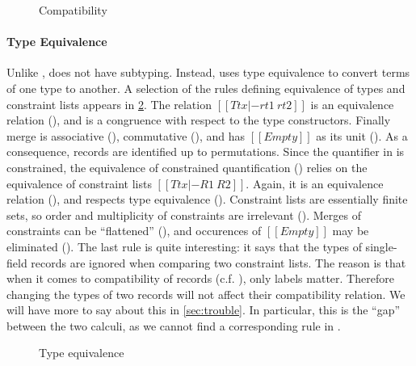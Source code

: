 \begin{figure}[t]
  \centering
{}


\caption{Compatibility}
\label{fig:compatible}

\end{figure}

\paragraph{Type Equivalence}

Unlike \fnamee, \rname does not have subtyping. Instead, \rname uses type
equivalence to convert terms of one type to another. A selection of the rules
defining equivalence of types and constraint lists appears in
\cref{fig:type_equivalence}. The relation $[[Ttx |- rt1 ~ rt2]]$ is an
equivalence relation (), and is a congruence
with respect to the type constructors. Finally merge is associative
(), commutative (), and has $[[Empty]]$
as its unit (). As a consequence, records are identified up
to permutations. Since the quantifier in \rname is constrained, the equivalence
of constrained quantification () relies on the equivalence of
constraint lists $[[Ttx |- R1 ~ R2]]$. Again, it is an equivalence relation
(), and respects type equivalence
(). Constraint lists are essentially finite sets, so order and
multiplicity of constraints are irrelevant (). Merges of
constraints can be ``flattened'' (), and occurences of
$[[Empty]]$ may be eliminated (). The last rule 
is quite interesting: it says that the types of single-field records are ignored
when comparing two constraint lists. The reason is that when it comes to
compatibility of records (c.f. ), only labels matter.
Therefore changing the types of two records will not affect their compatibility
relation. We will have more to say about this in \cref{sec:trouble}. In
particular, this is the ``gap'' between the two calculi, as we cannot find a
corresponding rule in \fnamee.

\begin{figure}[t]
  \centering
{}


\caption{Type equivalence}
\label{fig:type_equivalence}
\end{figure}

